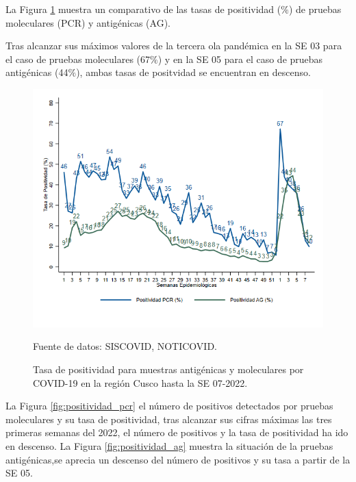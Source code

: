 \documentclass[12pt,a4paper,openany]{book}
\begin{document}
  La Figura \ref{fig:total_muestras_procesada} muestra un comparativo de las tasas de positividad ($\%$) de pruebas moleculares (PCR) y antigénicas (AG). 
  
  Tras alcanzar sus máximos valores de la tercera ola pandémica en la SE 03 para el caso de pruebas moleculares (67$\%$) y en la SE 05 para el caso de pruebas antigénicas (44$\%$), ambas tasas de positvidad se encuentran en descenso. 
  
   \begin{figure}[h]
	\caption{Tasa de positividad para muestras antigénicas y moleculares por COVID-19 en la región Cusco hasta la SE 07-2022. }\label{fig:total_muestras_procesada}
	\begin{center}
		\includegraphics[width=0.75\linewidth]{../figuras/positividad_diaria_2021_2022.png}
	\end{center}
	{\footnotesize {Fuente de datos: SISCOVID, NOTICOVID.}}
\end{figure}


La Figura \ref{fig:positividad_pcr} el número de positivos detectados por pruebas moleculares y su tasa de positividad, tras alcanzar sus cifras máximas las tres primeras semanas del 2022, el número de positivos y la tasa de positividad ha ido en descenso.  
 La Figura \ref{fig:positividad_ag}
muestra la situación de la pruebas antigénicas,se aprecia un descenso del número de positivos y su tasa a partir de la SE 05. 
\end{document}
